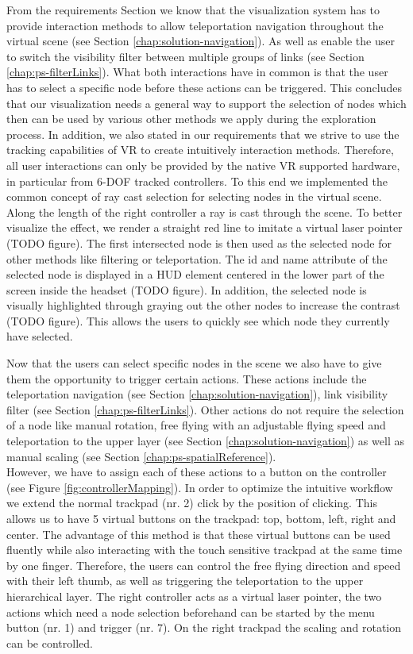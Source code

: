 From the requirements Section we know that the visualization system has to provide interaction methods to allow teleportation navigation throughout the virtual scene (see Section \ref{chap:solution-navigation}). As well as enable the user to switch the visibility filter between multiple groups of links (see Section \ref{chap:ps-filterLinks}).
What both interactions have in common is that the user has to select a specific node before these actions can be triggered. 
This concludes that our visualization needs a general way to support the selection of nodes which then can be used by various other methods we apply during the exploration process. 
In addition, we also stated in our requirements that we strive to use the tracking capabilities of VR to create intuitively interaction methods.
Therefore, all user interactions can only be provided by the native VR supported hardware, in particular from 6-DOF tracked controllers. 
To this end we implemented the common concept of ray cast selection for selecting nodes in the virtual scene. Along the length of the right controller a ray is cast through the scene. To better visualize the effect, we render a straight red line to imitate a virtual laser pointer (TODO figure). The first intersected node is then used as the selected node for other methods like filtering or teleportation. The id and name attribute of the selected node is displayed in a HUD element centered in the lower part of the screen inside the headset (TODO figure). In addition, the selected node is visually highlighted through graying out the other nodes to increase the contrast (TODO figure). This allows the users to quickly see which node they currently have selected.

Now that the users can select specific nodes in the scene we also have to give them the opportunity to trigger certain actions. These actions include the teleportation navigation (see Section \ref{chap:solution-navigation}), link visibility filter (see Section \ref{chap:ps-filterLinks}). 
Other actions do not require the selection of a node like manual rotation, free flying with an adjustable flying speed and teleportation to the upper layer (see Section \ref{chap:solution-navigation}) as well as manual scaling (see Section \ref{chap:ps-spatialReference}).\\
However, we have to assign each of these actions to a button on the controller (see Figure \ref{fig:controllerMapping}). In order to optimize the intuitive workflow we extend the normal trackpad (nr. 2) click by the position of clicking. 
This allows us to have 5 virtual buttons on the trackpad: top, bottom, left, right and center. The advantage of this method is that these virtual buttons can be used fluently while also interacting with the touch sensitive trackpad at the same time by one finger. 
Therefore, the users can control the free flying direction and speed with their left thumb, as well as triggering the teleportation to the upper hierarchical layer. The right controller acts as a virtual laser pointer, the two actions which need a node selection beforehand can be started by the menu button (nr. 1) and trigger (nr. 7). 
On the right trackpad the scaling and rotation can be controlled.

